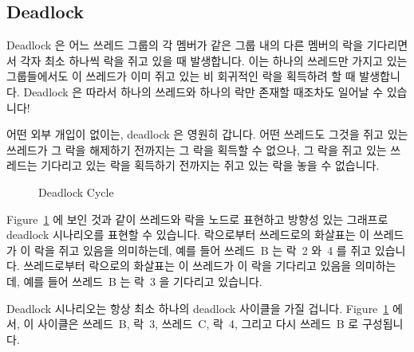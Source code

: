\fi

\subsection{Deadlock}
\label{sec:locking:Deadlock}

Deadlock 은 어느 쓰레드 그룹의 각 멤버가 같은 그룹 내의 다른 멤버의 락을
기다리면서 각자 최소 하나씩 락을 쥐고 있을 때 발생합니다.
이는 하나의 쓰레드만 가지고 있는 그룹들에서도 이 쓰레드가 이미 쥐고 있는 비
회귀적인 락을 획득하려 할 때 발생합니다.
Deadlock 은 따라서 하나의 쓰레드와 하나의 락만 존재할 때조차도 일어날 수
있습니다!

어떤 외부 개입이 없이는, deadlock 은 영원히 갑니다.
어떤 쓰레드도 그것을 쥐고 있는 쓰레드가 그 락을 해제하기 전까지는 그 락을
획득할 수 없으나, 그 락을 쥐고 있는 쓰레드는 기다리고 있는 락을 획득하기
전까지는 쥐고 있는 락을 놓을 수 없습니다.

\begin{figure}[tb]
\centering
{}
\caption{Deadlock Cycle}
\label{fig:locking:Deadlock Cycle}
\end{figure}

Figure~\ref{fig:locking:Deadlock Cycle} 에 보인 것과 같이 쓰레드와 락을 노드로
표현하고 방향성 있는 그래프로 deadlock 시나리오를 표현할 수 있습니다.
락으로부터 쓰레드로의 화살표는 이 쓰레드가 이 락을 쥐고 있음을 의미하는데, 예를
들어 쓰레드~B 는 락~2 와~4 를 쥐고 있습니다.
쓰레드로부터 락으로의 화살표는 이 쓰레드가 이 락을 기다리고 있음을 의미하는데,
예를 들어 쓰레드~B 는 락~3 을 기다리고 있습니다.

Deadlock 시나리오는 항상 최소 하나의 deadlock 사이클을 가질 겁니다.
Figure~\ref{fig:locking:Deadlock Cycle} 에서, 이 사이클은 쓰레드~B, 락~3,
쓰레드~C, 락~4, 그리고 다시 쓰레드~B 로 구성됩니다.

